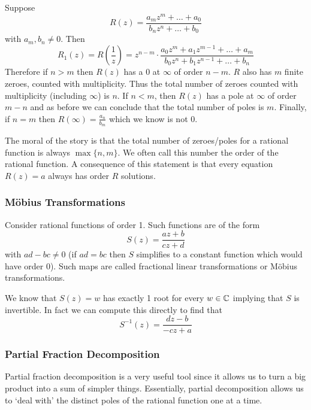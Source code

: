 Suppose
$$ R(z) = \frac{a_m z^m +\dots + a_0}{b_n z^n + \dots + b_0} $$
with $a_m, b_n \neq 0$. Then
$$ R_1(z) = R\left(\frac{1}{z}\right) = z^{n - m} \cdot \frac{a_0 z^m + a_1 z^{m - 1} + \dots + a_m}{b_0 z^n + b_1 z^{n - 1} +\dots + b_n} $$
Therefore if $n > m$ then $R(z)$ has a 0 at $\infty$ of order $n - m$. $R$ also has $m$ finite zeroes, counted with multiplicity. Thus the total number of zeroes counted with multiplicity (including $\infty$) is $n$. If $n < m$, then $R(z)$ has a pole at $\infty$ of order $m - n$ and as before we can conclude that the total number of poles is $m$. Finally, if $n = m$ then $R(\infty) = \frac{a_n}{b_m}$ which we know is not 0. 

The moral of the story is that the total number of zeroes/poles for a rational function is always $\max\{n, m\}$. We often call this number the order of the rational function. A consequence of this statement is that every equation $R(z) = a$ always has order $R$ solutions. 

\subsubsection{Möbius Transformations}
Consider rational functions of order 1. Such functions are of the form
$$ S(z) = \frac{az + b}{cz + d}$$
with $ad - bc \neq 0$ (if $ad = bc$ then $S$ simplifies to a constant function which would have order 0). Such maps are called fractional linear transformations or Möbius transformations. 

We know that $S(z) = w$ has exactly 1 root for every $w \in \mathbb{C}$ implying that $S$ is invertible. In fact we can compute this directly to find that 
$$ S^{-1}(z) = \frac{dz - b}{-cz + a}$$

\subsubsection{Partial Fraction Decomposition}
Partial fraction decomposition is a very useful tool since it allows us to turn a big product into a sum of simpler things. Essentially, partial decomposition allows us to `deal with' the distinct poles of the rational function one at a time.

